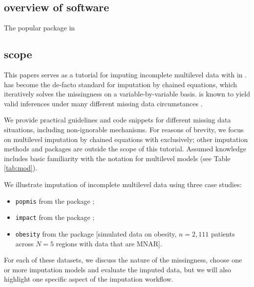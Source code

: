 \documentclass[
  article]{jss}
\providecommand{\tightlist}{%
  \setlength{\itemsep}{0pt}\setlength{\parskip}{0pt}}\usepackage{longtable,booktabs,array}
\begin{document}
\hypertarget{overview-of-software}{%
\subsection{overview of software}\label{overview-of-software}}

The popular  package in  \citet{R}

\hypertarget{scope}{%
\subsection{scope}\label{scope}}

This papers serves as a tutorial for imputing incomplete multilevel data
with  in .  has become the de-facto
standard for imputation by chained equations, which iteratively solves
the missingness on a variable-by-variable basis.  is known to
yield valid inferences under many different missing data circumstances
\citep{buur18}.

We provide practical guidelines and code snippets for different missing
data situations, including non-ignorable mechanisms. For reasons of
brevity, we focus on multilevel imputation by chained equations with
 exclusively; other imputation methods and packages \citep[see
e.g.][ and \citet{grun18}]{audi18} are outside the scope of this
tutorial. Assumed knowledge includes basic familiarity with the
 notation for multilevel models (see Table \ref{tab:mod}).

We illustrate imputation of incomplete multilevel data using three case
studies:

\begin{itemize}
\tightlist
\item
  \texttt{popmis} from the  package \citep[simulated data on
  perceived popularity, \(n = 2,000\) pupils across \(N = 100\) schools
  with data that are MAR,][]{mice};
\item
  \texttt{impact} from the  package \citep[empirical data
  on traumatic brain injuries, \(n = 11,022\) patients across \(N = 15\)
  studies with data that are MAR,][]{metamisc};
\item
  \texttt{obesity} from the  package {[}simulated data on
  obesity, \(n = 2,111\) patients across \(N = 5\) regions with data
  that are MNAR{]}.
\end{itemize}

For each of these datasets, we discuss the nature of the missingness,
choose one or more imputation models and evaluate the imputed data, but
we will also highlight one specific aspect of the imputation workflow.
\end{document}
